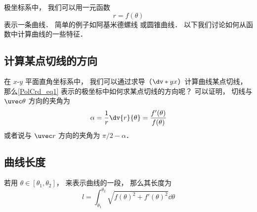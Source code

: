 
\begin{issues}
\issueDraft
\end{issues}


极坐标系中， 我们可以用一元函数
\begin{equation}\label{PolCrd_eq1}
r = f(\theta)
\end{equation}
表示一条曲线． 简单的例子如阿基米德螺线 或圆锥曲线． 以下我们讨论如何从函数中计算曲线的一些特征．

\subsection{计算某点切线的方向}


在 $x$-$y$ 平面直角坐标系中， 我们可以通过求导（$\dv*{y}{x}$）计算曲线某点切线， 那么\autoref{PolCrd_eq1} 表示的极坐标中如何求某点切线的方向呢？ 可以证明， 切线与 $\uvec\theta$ 方向的夹角为
\begin{equation}
\alpha = \frac{1}{r} \dv{r}{\theta} = \frac{f'(\theta)}{f(\theta)}
\end{equation}
或者说与 $\uvec r$ 方向的夹角为 $\pi/2 - \alpha$．


\subsection{曲线长度}

若用 $\theta \in [\theta_1, \theta_2]$， 来表示曲线的一段， 那么其长度为
\begin{equation}
l = \int_{\theta_1}^{\theta_2} \sqrt{f(\theta)^2 + f'(\theta)^2} \dd{\theta}
\end{equation}

